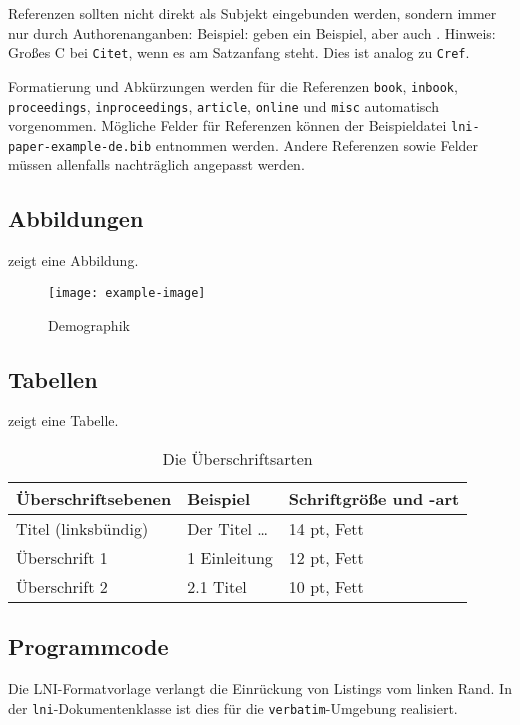 \documentclass[utf8,biblatex]{lni}
\begin{document}
{Referenzen sollten nicht direkt als Subjekt eingebunden werden, sondern immer nur durch Authorenanganben:
Beispiel:  geben ein Beispiel, aber auch \citet{Az09}.
Hinweis: Großes C bei \texttt{Citet}, wenn es am Satzanfang steht. Dies ist analog zu \texttt{Cref}.

Formatierung und Abkürzungen werden für die Referenzen \texttt{book}, \texttt{inbook}, \texttt{proceedings}, \texttt{inproceedings}, \texttt{article}, \texttt{online} und \texttt{misc} automatisch vorgenommen.
Mögliche Felder für Referenzen können der Beispieldatei \texttt{lni-paper-example-de.bib} entnommen werden.
Andere Referenzen sowie Felder müssen allenfalls nachträglich angepasst werden.

\subsection{Abbildungen}
 zeigt eine Abbildung.

\begin{figure}
  \centering
  \texttt{[image: example-image]}
  \caption{Demographik}
  \label{fig:demo}
\end{figure}

\subsection{Tabellen}
 zeigt eine Tabelle.

\begin{table}
\centering
\begin{tabular}{lll}
\toprule
Überschriftsebenen & Beispiel & Schriftgröße und -art \\
\midrule
Titel (linksbündig) & Der Titel \ldots & 14 pt, Fett\\
Überschrift 1 & 1 Einleitung & 12 pt, Fett\\
Überschrift 2 & 2.1 Titel & 10 pt, Fett\\
\bottomrule
\end{tabular}
\caption{Die Überschriftsarten}
\label{tab:demo}
\end{table}

\subsection{Programmcode}
Die LNI-Formatvorlage verlangt die Einrückung von Listings vom linken Rand.
In der \texttt{lni}-Dokumentenklasse ist dies für die \texttt{verbatim}-Umgebung realisiert.

}
\end{document}
